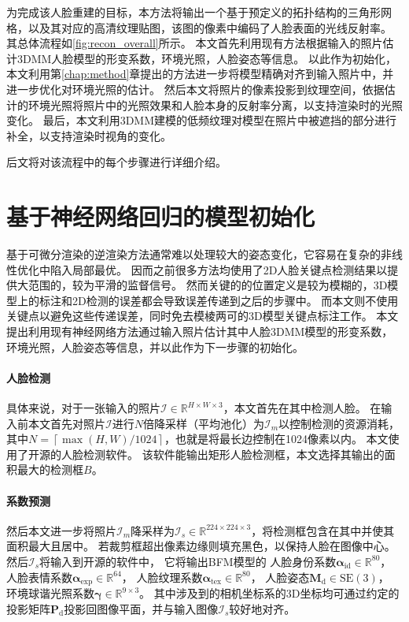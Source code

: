 为完成该人脸重建的目标，本方法将输出一个基于预定义的拓扑结构的三角形网格，以及其对应的高清纹理贴图，该图的像素中编码了人脸表面的光线反射率。
其总体流程如\ref{fig:recon_overall}所示。
本文首先利用现有方法\citep{deep3d}根据输入的照片估计3DMM人脸模型的形变系数，环境光照，人脸姿态等信息。
以此作为初始化，本文利用第\ref{chap:method}章提出的方法进一步将模型精确对齐到输入照片中，并进一步优化对环境光照的估计。
然后本文将照片的像素投影到纹理空间，依据估计的环境光照将照片中的光照效果和人脸本身的反射率分离，以支持渲染时的光照变化。
最后，本文利用3DMM建模的低频纹理对模型在照片中被遮挡的部分进行补全，以支持渲染时视角的变化。

后文将对该流程中的每个步骤进行详细介绍。

\section{基于神经网络回归的模型初始化}
\label{sec:recon_init}

基于可微分渲染的逆渲染方法通常难以处理较大的姿态变化，它容易在复杂的非线性优化中陷入局部最优。
因而之前很多方法均使用了2D人脸关键点检测结果以提供大范围的，较为平滑的监督信号。
然而关键的的位置定义是较为模糊的，3D模型上的标注和2D检测的误差都会导致误差传递到之后的步骤中。
而本文则不使用关键点以避免这些传递误差，同时免去模棱两可的3D模型关键点标注工作。
本文提出利用现有神经网络方法\citep{deep3d}通过输入照片估计其中人脸3DMM模型的形变系数，环境光照，人脸姿态等信息，并以此作为下一步骤的初始化。

\paragraph{人脸检测}
具体来说，对于一张输入的照片$\mathcal{I}\in\mathbb{R}^{H\times W\times 3}$，本文首先在其中检测人脸。
在输入前本文首先对照片$\mathcal{I}$进行$N$倍降采样（平均池化）为$\mathcal{I}_m$以控制检测的资源消耗，其中$N=\left\lceil \max(H, W) / 1024\right\rceil$，也就是将最长边控制在1024像素以内。
本文使用了\citet{SFD}开源的人脸检测软件。
该软件能输出矩形人脸检测框，本文选择其输出的面积最大的检测框$B$。

\paragraph{系数预测}
然后本文进一步将照片$\mathcal{I}_m$降采样为$\mathcal{I}_s\in\mathbb{R}^{224\times 224\times 3}$，将检测框包含在其中并使其面积最大且居中。
若裁剪框超出像素边缘则填充黑色，以保持人脸在图像中心。
然后$\mathcal{I}_s$将输入到\citet{deep3d}开源的软件中，
它将输出BFM模型\citep{BFM}的
人脸身份系数$\mathbf{\alpha}_\mathrm{id}\in\mathbb{R}^{80}$，
人脸表情系数$\mathbf{\alpha}_\mathrm{exp}\in\mathbb{R}^{64}$，
人脸纹理系数$\mathbf{\alpha}_\mathrm{tex}\in\mathbb{R}^{80}$，
人脸姿态$\mathbf{M}_\mathrm{d}\in\mathrm{SE(3)}$，
环境球谐光照系数$\mathbf{\gamma}\in\mathbb{R}^{9\times 3}$。
其中涉及到的相机坐标系的3D坐标均可通过约定的投影矩阵$\mathbf{P}_\mathrm{d}$投影回图像平面，并与输入图像$\mathcal{I}_s$较好地对齐。

